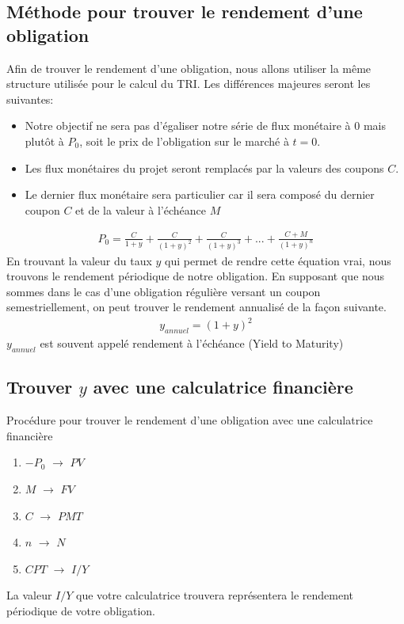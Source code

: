 \documentclass[12pt]{article}
\begin{document}
\subsection{Méthode pour trouver le rendement d'une obligation}
Afin de trouver le rendement d'une obligation, nous allons utiliser la même structure utilisée pour le calcul du TRI. Les différences majeures seront les suivantes:
\begin{itemize}
\item Notre objectif ne sera pas d'égaliser notre série de flux monétaire à 0 mais plutôt à $P_0$, soit le prix de l'obligation sur le marché à $t=0$. 
\item Les flux monétaires du projet seront remplacés par la valeurs des coupons $C$.
\item Le dernier flux monétaire sera particulier car il sera composé du dernier coupon $C$ et de la valeur à l'échéance $M$
\end{itemize}
\begin{align*}
P_0=\frac{C}{1+y}+\frac{C}{(1+y)^2}+\frac{C}{(1+y)^3}+...+\frac{C+M}{(1+y)^n}
\end{align*}
En trouvant la valeur du taux $y$ qui permet de rendre cette équation vrai, nous trouvons le rendement périodique de notre obligation. En supposant que nous sommes dans le cas d'une obligation régulière versant un coupon semestriellement, on peut trouver le rendement annualisé de la façon suivante.
\begin{align*}
y_{annuel}=(1+y)^2
\end{align*}
$y_{annuel}$ est souvent appelé rendement à l'échéance (Yield to Maturity)
\subsection{Trouver $y$ avec une calculatrice financière}
Procédure pour trouver le rendement d'une obligation avec une calculatrice financière
\begin{enumerate}
\item $-P_0$ $\rightarrow$ $PV$
\item $M$ $\rightarrow$ $FV$
\item $C$ $\rightarrow$ $PMT$
\item $n$ $\rightarrow$ $N$
\item $CPT$ $\rightarrow$ $I/Y$
\end{enumerate}
La valeur $I/Y$ que votre calculatrice trouvera représentera le rendement périodique de votre obligation. 

\newpage
\end{document}
